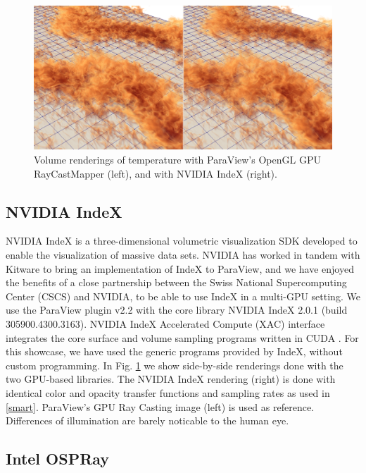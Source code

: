 \documentclass[5p,times]{elsarticle}
\begin{document}
\begin{figure}
	\centering
	\includegraphics[width=\linewidth]{fig2}%
	\caption{\label{fig:gpucloseup} Volume renderings of temperature with ParaView's
OpenGL GPU RayCastMapper (left), and with NVIDIA IndeX (right).}
\end{figure}

\subsection{NVIDIA IndeX} \label{index}

NVIDIA IndeX \cite{NVIDIAIndeX} is a three-dimensional volumetric visualization SDK developed to enable
the visualization of massive data sets. NVIDIA has worked in tandem with Kitware to
bring an implementation of IndeX to ParaView, and we have enjoyed the benefits
of a close partnership between the Swiss National Supercomputing Center (CSCS)
and NVIDIA, to be able to use IndeX in a multi-GPU setting. We use the ParaView
plugin v2.2 with the core library NVIDIA IndeX 2.0.1 (build 305900.4300.3163).
NVIDIA IndeX Accelerated Compute (XAC) interface integrates the core surface
and volume sampling programs written in CUDA \cite{SC18IndexShowcase}.
For this showcase, we have used the generic programs provided by IndeX, without custom programming.
In Fig. \ref{fig:gpucloseup} we show side-by-side renderings done with the
two GPU-based libraries. The NVIDIA IndeX rendering (right) is done with identical
color and opacity transfer functions and sampling rates as used in \ref{smart}. ParaView's
GPU Ray Casting image (left) is used as reference. Differences of
illumination are barely noticable to the human eye.

\subsection{Intel OSPRay}
\end{document}
